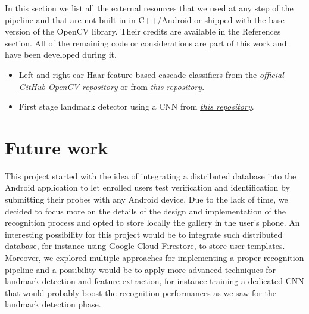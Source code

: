 \documentclass{article}
\begin{document}
In this section we list all the external resources that we used at any step of the pipeline and that are not
built-in in C++/Android or shipped with the base version of the OpenCV library. Their credits are available in
the References section. All of the remaining code or considerations are part of this work and have been
developed during it.

\begin{itemize}
    \item Left and right ear Haar feature-based cascade classifiers from
        the
        \href{https://github.com/DiUS/Physiognomy/tree/master/python/haarcascades}{\emph{official GitHub OpenCV repository}}
        or from
        \href{https://github.com/DiUS/Physiognomy/tree/master/python/haarcascades}{\emph{this repository}}.
    \item First stage landmark detector using a CNN from
        \href{https://github.com/maups/ear-recognition}{\emph{this repository}}.
\end{itemize}

\section{Future work}

This project started with the idea of integrating a distributed database into the Android application to let
enrolled users test verification and identification by submitting their probes with any Android device. Due to
the lack of time, we decided to focus more on the details of the design and implementation of the recognition
process and opted to store locally the gallery in the user's phone. An interesting possibility for this project
would be to integrate such distributed database, for instance using Google Cloud Firestore, to store user templates.
Moreover, we explored multiple approaches for implementing a proper recognition pipeline and a possibility would be
to apply more advanced techniques for landmark detection and feature extraction, for instance training a dedicated
CNN that would probably boost the recognition performances as we saw for the landmark detection phase.



\end{document}
